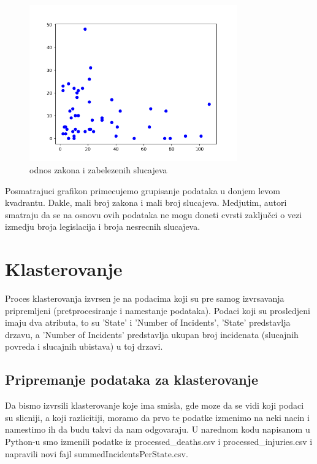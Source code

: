 \documentclass[11pt]{article} %
\begin{document}
\begin{figure}[h!]
	\centering
	\includegraphics[width=0.8\textwidth]{gun_laws_chart}
	\caption{odnos zakona i zabelezenih slucajeva}
\end{figure}
Posmatrajuci grafikon primecujemo grupisanje podataka u donjem levom kvadrantu. Dakle, mali broj zakona i mali broj slucajeva.
Medjutim, autori smatraju da se na osnovu ovih podataka ne mogu doneti cvrsti zaključci o vezi izmedju broja legislacija i broja 
nesrecnih slucajeva.

	
	
	\newpage
	\section{Klasterovanje}
	Proces klasterovanja izvrsen je na podacima koji su pre samog izvrsavanja pripremljeni (pretprocesiranje i namestanje podataka). 
	Podaci koji su prosledjeni imaju dva atributa, to su 'State' i 'Number of Incidents', 'State' predstavlja drzavu, a 'Number of Incidents' predstavlja 
	ukupan broj incidenata (slucajnih povreda i slucajnih ubistava) u toj drzavi.
	
	\subsection{Pripremanje podataka za klasterovanje}
	Da bismo izvrsili klasterovanje koje ima smisla, gde moze da se vidi koji podaci su slicniji, a koji razlicitiji, moramo da prvo te podatke izmenimo na 
	neki nacin i namestimo ih da budu takvi da nam odgovaraju. U narednom kodu napisanom u Python-u smo izmenili podatke iz 
	processed\_deaths.csv i processed\_injuries.csv i napravili novi fajl summedIncidentsPerState.csv.
	\newline
	
\end{document}
